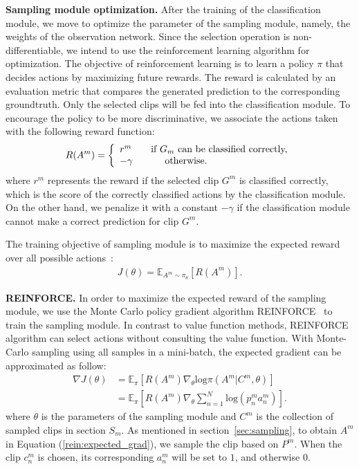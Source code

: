 \documentclass[journal]{IEEEtran}
\begin{document}
{\bf Sampling module optimization.} After the training of the classification module, we move to optimize the parameter of the sampling module, namely, the weights of the observation network.
Since the selection operation is non-differentiable, we intend to use the reinforcement learning algorithm for optimization.
The objective of reinforcement learning is to learn a policy $\pi$ that decides actions by maximizing future rewards.
The reward is calculated by an evaluation metric that compares the generated prediction to the corresponding groundtruth.
Only the selected clips will be fed into the classification module.
To encourage the policy to be more discriminative, we associate the actions taken with the following reward function:
\begin{equation}
R(A^m)=
\left\{
\begin{array}{lr}
r^m   \quad \quad \text{if $G_m$ can be classified correctly,} \\
-\gamma \quad \text{ \qquad  otherwise.}
\end{array}
\right.
\label{rein:rewards}
\end{equation}
where $r^m$ represents the reward if the selected clip $G^m$ is classified correctly, which is the score of the correctly classified actions by the classification module.
On the other hand, we penalize it with a constant $-\gamma$ if the classification module cannot make a correct prediction for clip $G^m$.

The training objective of sampling module is to maximize the expected reward over all possible actions~\cite{SuttonB98}:
\begin{equation}
\begin{aligned}
J(\theta)=\mathbb{E}_{A^m\sim \pi_\theta}[R(A^m)].
\end{aligned}
\label{rein:expected_reward}
\end{equation}

\textbf{REINFORCE.} In order to maximize the expected reward of the sampling module, we use the Monte Carlo policy gradient algorithm REINFORCE~\cite{SuttonB98} to train the sampling module.
In contrast to value function methods, REINFORCE algorithm can select actions without consulting the value function.
With Monte-Carlo sampling using all samples in a mini-batch, the expected gradient can be approximated as follow:
\begin{equation}
\begin{aligned}
\nabla J(\theta)&=\mathbb{E}_{\pi} \left[R(A^m) \nabla_\theta\text{log} \pi(A^m|C^m,\theta)\right]\\
&=\mathbb{E}_{\pi} [R(A^m) \nabla_\theta \sum_{n=1}^N \text{log} (p^m_n a^m_n)].
\end{aligned}
\label{rein:expected_grad}
\end{equation}
where $\theta$ is the parameters of the sampling module and $C^m$ is the collection of sampled clips in section $S_m$.
As mentioned in section~\ref{sec:sampling}, to obtain $A^m$ in Equation (\ref{rein:expected_grad}), we sample the clip based on $P^m$.
When the clip $c_n^m$ is chosen, its corresponding $a_n^m$ will be set to $1$, and otherwise $0$.
\end{document}
